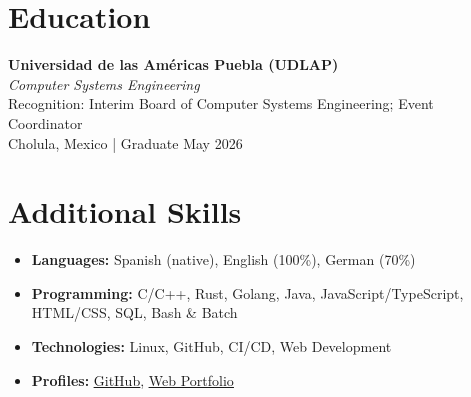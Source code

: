 \documentclass[a4paper,10pt]{article}
\begin{document}
\section*{Education}
\textbf{Universidad de las Américas Puebla (UDLAP)}\\
\textit{Computer Systems Engineering}\\
Recognition: Interim Board of Computer Systems Engineering; Event Coordinator\\
Cholula, Mexico | Graduate May 2026

\section*{Additional Skills}
\begin{itemize}
    \item \textbf{Languages:} Spanish (native), English (100\%), German (70\%)
    \item \textbf{Programming:} C/C++, Rust, Golang, Java, JavaScript/TypeScript, HTML/CSS, SQL, Bash \& Batch
    \item \textbf{Technologies:} Linux, GitHub, CI/CD, Web Development
    \item \textbf{Profiles:} \underline{\href{https://github.com/HugeErick}{GitHub}}, \underline{\href{https://portafolio-delta-wheat.vercel.app/}{Web Portfolio}}
\end{itemize}
\end{document}
